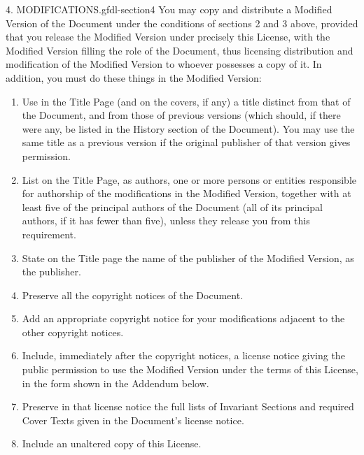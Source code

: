 \documentclass[10pt,]{book}
\numberwithin{equation}{section}
\begin{document}
\begin{paragraphs}{4. MODIFICATIONS.}{gfdl-section4}%
\hypertarget{p-1546}{}%
You may copy and distribute a Modified Version of the Document under the conditions of sections 2 and 3 above, provided that you release the Modified Version under precisely this License, with the Modified Version filling the role of the Document, thus licensing distribution and modification of the Modified Version to whoever possesses a copy of it. In addition, you must do these things in the Modified Version:%
\leavevmode%
\begin{enumerate}[label=\Alph*.]
\item\hypertarget{li-147}{}\hypertarget{p-1547}{}%
Use in the Title Page (and on the covers, if any) a title distinct from that of the Document, and from those of previous versions (which should, if there were any, be listed in the History section of the Document). You may use the same title as a previous version if the original publisher of that version gives permission.%
\item\hypertarget{li-148}{}\hypertarget{p-1548}{}%
List on the Title Page, as authors, one or more persons or entities responsible for authorship of the modifications in the Modified Version, together with at least five of the principal authors of the Document (all of its principal authors, if it has fewer than five), unless they release you from this requirement.%
\item\hypertarget{li-149}{}\hypertarget{p-1549}{}%
State on the Title page the name of the publisher of the Modified Version, as the publisher.%
\item\hypertarget{li-150}{}\hypertarget{p-1550}{}%
Preserve all the copyright notices of the Document.%
\item\hypertarget{li-151}{}\hypertarget{p-1551}{}%
Add an appropriate copyright notice for your modifications adjacent to the other copyright notices.%
\item\hypertarget{li-152}{}\hypertarget{p-1552}{}%
Include, immediately after the copyright notices, a license notice giving the public permission to use the Modified Version under the terms of this License, in the form shown in the Addendum below.%
\item\hypertarget{li-153}{}\hypertarget{p-1553}{}%
Preserve in that license notice the full lists of Invariant Sections and required Cover Texts given in the Document's license notice.%
\item\hypertarget{li-154}{}\hypertarget{p-1554}{}%
Include an unaltered copy of this License.%

\end{enumerate}
\end{paragraphs}
\end{document}
